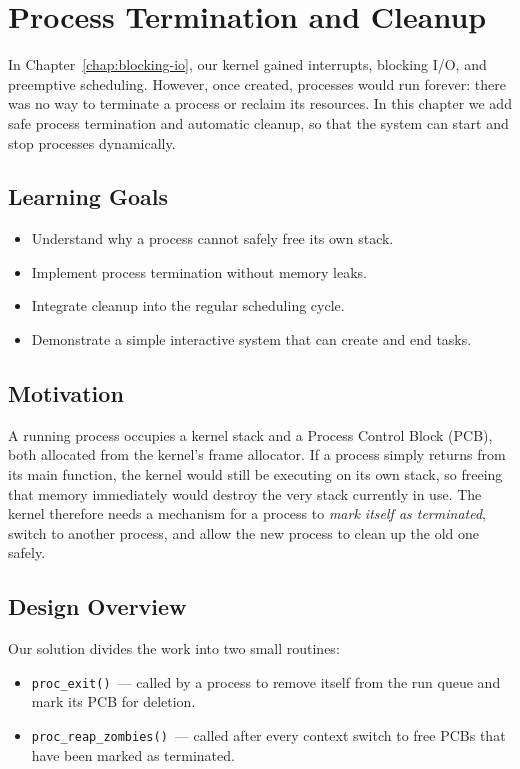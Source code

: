 \chapter{Process Termination and Cleanup}
\label{chap:termination}

In Chapter~\ref{chap:blocking-io}, our kernel gained interrupts, blocking I/O,
and preemptive scheduling.  However, once created, processes would run forever:
there was no way to terminate a process or reclaim its resources.
In this chapter we add safe process termination and automatic cleanup,
so that the system can start and stop processes dynamically.

\section{Learning Goals}

\begin{itemize}
  \item Understand why a process cannot safely free its own stack.
  \item Implement process termination without memory leaks.
  \item Integrate cleanup into the regular scheduling cycle.
  \item Demonstrate a simple interactive system that can create and end tasks.
\end{itemize}

\section{Motivation}

A running process occupies a kernel stack and a Process Control Block (PCB),
both allocated from the kernel’s frame allocator.  If a process simply returns
from its main function, the kernel would still be executing on its own stack,
so freeing that memory immediately would destroy the very stack currently in
use.  The kernel therefore needs a mechanism for a process to
\emph{mark itself as terminated}, switch to another process, and allow the new
process to clean up the old one safely.

\section{Design Overview}

Our solution divides the work into two small routines:
\begin{itemize}
  \item \texttt{proc\_exit()}~— called by a process to remove itself from the
        run queue and mark its PCB for deletion.
  \item \texttt{proc\_reap\_zombies()}~— called after every context switch to
        free PCBs that have been marked as terminated.
\end{itemize}

